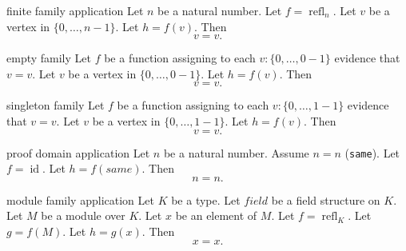 \begin{cleanresult}{finite family application}
Let $n$ be a natural number.
Let $f = \operatorname{refl}_{n}$.
Let $v$ be a vertex in $\{0,\ldots,n-1\}$.
Let $h = f(v)$.
Then \[v = v.\]
\end{cleanresult}

\begin{cleanresult}{empty family}
Let $f$ be a function assigning to each $v : \{0,\ldots,0-1\}$ evidence that $v = v$.
Let $v$ be a vertex in $\{0,\ldots,0-1\}$.
Let $h = f(v)$.
Then \[v = v.\]
\end{cleanresult}

\begin{cleanresult}{singleton family}
Let $f$ be a function assigning to each $v : \{0,\ldots,1-1\}$ evidence that $v = v$.
Let $v$ be a vertex in $\{0,\ldots,1-1\}$.
Let $h = f(v)$.
Then \[v = v.\]
\end{cleanresult}

\begin{cleanresult}{proof domain application}
Let $n$ be a natural number.
Assume $n = n$ (\texttt{same}).
Let $f = \operatorname{id}$.
Let $h = f(\mathit{same})$.
Then \[n = n.\]
\end{cleanresult}

\begin{cleanresult}{module family application}
Let $K$ be a type.
Let $\mathit{field}$ be a field structure on $K$.
Let $M$ be a module over $K$.
Let $x$ be an element of $M$.
Let $f = \operatorname{refl}_{K}$.
Let $g = f(M)$.
Let $h = g(x)$.
Then \[x = x.\]
\end{cleanresult}


